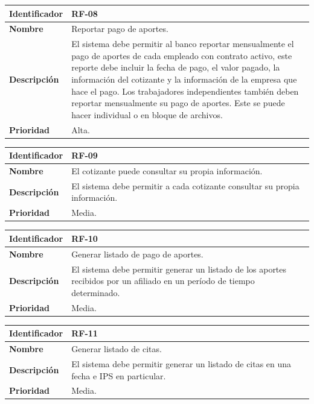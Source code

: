 \documentclass[12pt,a4paper]{article}
\begin{document}
\begin{center}
\begin{tabular}{|m{5.5cm}|m{9.5cm}|}
\hline
\textbf{Identificador} & RF-08\\
\hline
\textbf{Nombre} & Reportar pago de aportes.\\
\hline
\textbf{Descripción} & El sistema debe permitir al banco reportar mensualmente el pago de aportes de cada empleado con contrato activo, este reporte debe incluir la fecha de pago, el valor pagado, la información del cotizante y la información de la empresa que hace el pago. Los trabajadores independientes también deben reportar mensualmente su pago de aportes. Este se puede hacer individual o en bloque de archivos.\\
\hline
\textbf{Prioridad} & Alta.\\
\hline
\end{tabular}
\vspace{5mm}

\begin{tabular}{|m{5.5cm}|m{9.5cm}|}
\hline
\textbf{Identificador} & RF-09\\
\hline
\textbf{Nombre} & El cotizante puede consultar su propia información.\\
\hline
\textbf{Descripción} & El sistema debe permitir a cada cotizante consultar su propia información.\\
\hline
\textbf{Prioridad} & Media.\\
\hline
\end{tabular}
\vspace{5mm}

\begin{tabular}{|m{5.5cm}|m{9.5cm}|}
\hline
\textbf{Identificador} & RF-10\\
\hline
\textbf{Nombre} & Generar listado de pago de aportes.\\
\hline
\textbf{Descripción} & El sistema debe permitir generar un listado de los aportes recibidos por un afiliado en un período de tiempo determinado.\\
\hline
\textbf{Prioridad} & Media.\\
\hline
\end{tabular}
\vspace{5mm}

\begin{tabular}{|m{5.5cm}|m{9.5cm}|}
\hline
\textbf{Identificador} & RF-11\\
\hline
\textbf{Nombre} & Generar listado de citas.\\
\hline
\textbf{Descripción} & El sistema debe permitir generar un listado de citas en una fecha e IPS en particular.\\
\hline
\textbf{Prioridad} & Media.\\
\hline
\end{tabular}
\vspace{5mm}
\end{center}
\end{document}
